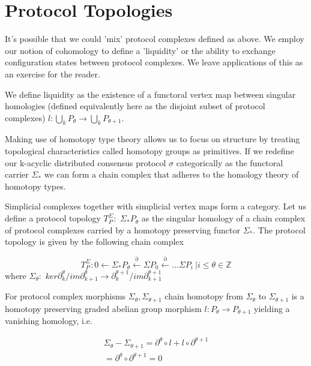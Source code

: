 \documentclass{article}
\begin{document}
\section{Protocol Topologies}
It's possible that we could 'mix' protocol complexes defined as above. We employ our notion of cohomology to define a 'liquidity' or the ability to exchange configuration states between protocol complexes. We leave applications of this as an exercise for the reader.

We define liquidity as the existence of a functoral vertex map between singular homologies (defined equivalently here as the disjoint subset of protocol complexes) $l: \bigcup_{k} P_{\theta} \rightarrow \bigcup_{k} P_{\theta+1}$.

Making use of homotopy type theory allows us to focus on structure by treating topological characteristics called homotopy groups as primitives. If we redefine our k-acyclic distributed consensus protocol $\sigma$ categorically as the functoral carrier $\Sigma_{*}$  we can form a chain complex that adheres to the homology theory of homotopy types.

Simplicial complexes together with simplicial vertex maps form a category. Let us define a protocol topology $T^{\Sigma}_P: $ $\Sigma_{*}P_\theta$ as the singular homology of a chain complex of protocol complexes carried by a homotopy preserving functor $\Sigma_*$. The protocol topology is given by the following chain complex

\begin{equation} \label{eq1}
T^{\Sigma}_P: 0 \leftarrow \Sigma_{*}P_\theta \xleftarrow{\partial} \Sigma P_{0} \xleftarrow{\partial} \dots \Sigma P_i \ | i \leq \theta \in \mathbb{Z}
\end{equation} \label{eq1}
where $\Sigma_\theta: $ $ker \partial^{\theta}_{k}/im \partial^{\theta}_{k+1} \rightarrow \partial^{\theta+1}_{k} /im \partial^{\theta+1}_{k+1}$ 

For protocol complex morphisms $\Sigma_\theta, \Sigma_{\theta+1}$ chain homotopy from $\Sigma_\theta$ to $\Sigma_{\theta+1}$ is a homotopy preserving graded abelian group morphism $l: P_{\theta} \rightarrow P_{\theta+1}$ yielding a vanishing homology, i.e. 

\begin{equation} \label{eq1}
\begin{split}
\Sigma_\theta - \Sigma_{\theta+1} =  \partial^{\theta}\circ l + l \circ \partial^{\theta+1} \\
= \partial^\theta \circ \partial^{\theta+1} = 0 \\
\end{split}
\end{equation}
\end{document}

